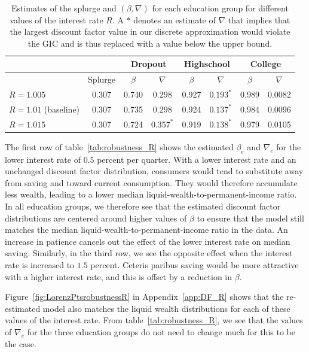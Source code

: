 \documentclass[\econtexRoot/HAFiscal]{subfiles}
\begin{document}
\begin{table}[t]
	\begin{center}
		\begin{tabular}{lc|cccccc} 
			\toprule
			& & \multicolumn{2}{c}{Dropout} & \multicolumn{2}{c}{Highschool} & \multicolumn{2}{c}{College} \\ \midrule 
			& Splurge & $\beta$ & $\nabla$ & $\beta$ & $\nabla$ & $\beta$ & $\nabla$ \\ \midrule 
			$R = 1.005$ & 0.307 & 0.740 & 0.298 & 0.927 & $0.193^{*}$ & 0.989 & 0.0082 \\
			$R = 1.01$ (baseline) & 0.307 & 0.735 & 0.298 & 0.924 & $0.137^{*}$ & 0.984 & 0.0096 \\ 
			$R = 1.015$ & 0.307 & 0.724 & $0.357^{*}$ & 0.919 & $0.138^{*}$ & 0.979 & 0.0105 
			\\ \bottomrule 
		\end{tabular}
		\caption{Estimates of the splurge and $(\beta,\nabla)$ for each education group for different values of the interest rate $R$. A $*$ denotes an estimate of $\nabla$ that implies that the largest discount factor value in our discrete approximation would violate the GIC and is thus replaced with a value below the upper bound.}
		\notinsubfile{\label{tab:robustness_R}}
	\end{center}
\end{table}

The first row of table~\ref{tab:robustness_R} shows the estimated $\beta_e$ and $\nabla_e$ for the lower interest rate of $0.5$ percent per quarter. With a lower interest rate and an unchanged discount factor distribution, consumers would tend to substitute away from saving and toward current consumption. They would therefore accumulate less wealth, leading to a lower median liquid-wealth-to-permanent-income ratio. In all education groups, we therefore see that the estimated discount factor distributions are centered around higher values of $\beta$ to ensure that the model still matches the median liquid-wealth-to-permanent-income ratio in the data. An increase in patience cancels out the effect of the lower interest rate on median saving. Similarly, in the third row, we see the opposite effect when the interest rate is increased to $1.5$ percent. Ceteris paribus saving would be more attractive with a higher interest rate, and this is offset by a reduction in $\beta$. 

Figure~\ref{fig:LorenzPtsrobustnessR} in Appendix~\ref{app:DF_R} shows that the re-estimated model also matches the liquid wealth distributions for each of these values of the interest rate. From table~\ref{tab:robustness_R}, we see that the values of $\nabla_e$ for the three education groups do not need to change much for this to be the case. 
\end{document}
